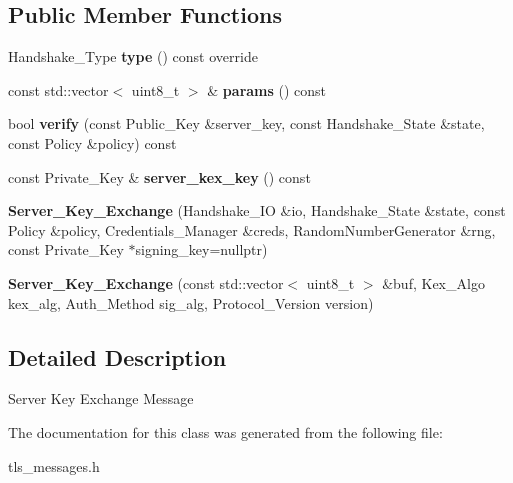 \subsection*{Public Member Functions}
\begin{DoxyCompactItemize}
\item 
\mbox{\label{class_botan_1_1_t_l_s_1_1_server___key___exchange_a4edb7eebfc55b3d18dc6a18b63091655}} 
Handshake\+\_\+\+Type {\bfseries type} () const override
\item 
\mbox{\label{class_botan_1_1_t_l_s_1_1_server___key___exchange_af5966fedc34858a66ea1f8a74f5abb12}} 
const std\+::vector$<$ uint8\+\_\+t $>$ \& {\bfseries params} () const
\item 
\mbox{\label{class_botan_1_1_t_l_s_1_1_server___key___exchange_a0faea67530e26fe74f163b481d56ffc1}} 
bool {\bfseries verify} (const Public\+\_\+\+Key \&server\+\_\+key, const Handshake\+\_\+\+State \&state, const Policy \&policy) const
\item 
\mbox{\label{class_botan_1_1_t_l_s_1_1_server___key___exchange_ab9a8bcbbe06f970f3bda13b096841587}} 
const Private\+\_\+\+Key \& {\bfseries server\+\_\+kex\+\_\+key} () const
\item 
\mbox{\label{class_botan_1_1_t_l_s_1_1_server___key___exchange_ae98108eac7f710925eb16550a3adfbb2}} 
{\bfseries Server\+\_\+\+Key\+\_\+\+Exchange} (Handshake\+\_\+\+IO \&io, Handshake\+\_\+\+State \&state, const Policy \&policy, Credentials\+\_\+\+Manager \&creds, Random\+Number\+Generator \&rng, const Private\+\_\+\+Key $\ast$signing\+\_\+key=nullptr)
\item 
\mbox{\label{class_botan_1_1_t_l_s_1_1_server___key___exchange_a0d4cd9517e4cafacb1217cec99bd0035}} 
{\bfseries Server\+\_\+\+Key\+\_\+\+Exchange} (const std\+::vector$<$ uint8\+\_\+t $>$ \&buf, Kex\+\_\+\+Algo kex\+\_\+alg, Auth\+\_\+\+Method sig\+\_\+alg, Protocol\+\_\+\+Version version)
\end{DoxyCompactItemize}


\subsection{Detailed Description}
Server Key Exchange Message 

The documentation for this class was generated from the following file\+:\begin{DoxyCompactItemize}
\item 
tls\+\_\+messages.\+h\end{DoxyCompactItemize}
